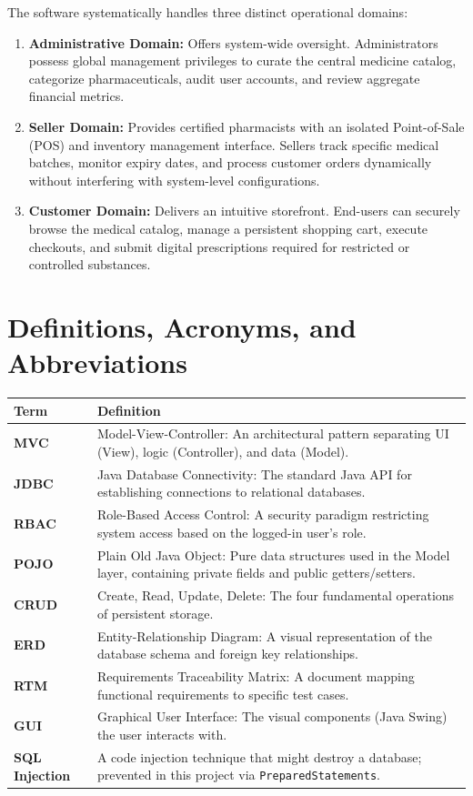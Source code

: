 \documentclass[12pt,a4paper]{report}
\begin{document}
The software systematically handles three distinct operational domains:
\begin{enumerate}
    \item \textbf{Administrative Domain:} Offers system-wide oversight. Administrators possess global management privileges to curate the central medicine catalog, categorize pharmaceuticals, audit user accounts, and review aggregate financial metrics.
    \item \textbf{Seller Domain:} Provides certified pharmacists with an isolated Point-of-Sale (POS) and inventory management interface. Sellers track specific medical batches, monitor expiry dates, and process customer orders dynamically without interfering with system-level configurations.
    \item \textbf{Customer Domain:} Delivers an intuitive storefront. End-users can securely browse the medical catalog, manage a persistent shopping cart, execute checkouts, and submit digital prescriptions required for restricted or controlled substances.
\end{enumerate}

\section{Definitions, Acronyms, and Abbreviations}
\begin{longtable}{>{\bfseries}p{3.5cm} p{11cm}}
\toprule
\rowcolor{headerBlue}\color{white}\textbf{Term} & \color{white}\textbf{Definition} \\
\midrule
\endfirsthead
\rowcolor{rowOdd}  MVC          & Model-View-Controller: An architectural pattern separating UI (View), logic (Controller), and data (Model). \\
\rowcolor{rowEven} JDBC         & Java Database Connectivity: The standard Java API for establishing connections to relational databases. \\
\rowcolor{rowOdd}  RBAC         & Role-Based Access Control: A security paradigm restricting system access based on the logged-in user's role. \\
\rowcolor{rowEven} POJO         & Plain Old Java Object: Pure data structures used in the Model layer, containing private fields and public getters/setters. \\
\rowcolor{rowOdd}  CRUD         & Create, Read, Update, Delete: The four fundamental operations of persistent storage. \\
\rowcolor{rowEven} ERD          & Entity-Relationship Diagram: A visual representation of the database schema and foreign key relationships. \\
\rowcolor{rowOdd}  RTM          & Requirements Traceability Matrix: A document mapping functional requirements to specific test cases. \\
\rowcolor{rowEven} GUI          & Graphical User Interface: The visual components (Java Swing) the user interacts with. \\
\rowcolor{rowOdd}  SQL Injection & A code injection technique that might destroy a database; prevented in this project via \texttt{PreparedStatements}. \\
\bottomrule
\end{longtable}
\end{document}
